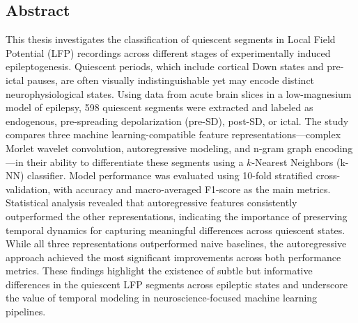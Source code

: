 \documentclass{article}
\begin{document}
\begin{center}
	\section*{Abstract}
\end{center}
	\noindent
	This thesis investigates the classification of quiescent segments in Local Field Potential (LFP) recordings across different stages of experimentally induced epileptogenesis. Quiescent periods, which include cortical Down states and pre-ictal pauses, are often visually indistinguishable yet may encode distinct neurophysiological states. Using data from acute brain slices in a low-magnesium model of epilepsy, 598 quiescent segments were extracted and labeled as endogenous, pre-spreading depolarization (pre-SD), post-SD, or ictal. The study compares three machine learning-compatible feature representations—complex Morlet wavelet convolution, autoregressive modeling, and n-gram graph encoding—in their ability to differentiate these segments using a $k$-Nearest Neighbors (k-NN) classifier. Model performance was evaluated using 10-fold stratified cross-validation, with accuracy and macro-averaged F1-score as the main metrics. Statistical analysis revealed that autoregressive features consistently outperformed the other representations, indicating the importance of preserving temporal dynamics for capturing meaningful differences across quiescent states. While all three representations outperformed naive baselines, the autoregressive approach achieved the most significant improvements across both performance metrics. These findings highlight the existence of subtle but informative differences in the quiescent LFP segments across epileptic states and underscore the value of temporal modeling in neuroscience-focused machine learning pipelines.

\newpage
\end{document}
